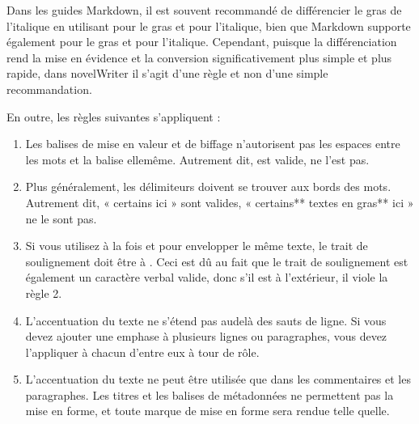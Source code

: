 \documentclass[a4paper,11pt,french]{sphinxmanual}
\begin{document}
\sphinxAtStartPar
Dans les guides Markdown, il est souvent recommandé de différencier le gras de l’italique en utilisant \sphinxcode{\sphinxupquote{**}} pour le gras et \sphinxcode{\sphinxupquote{\_}} pour l’italique, bien que Markdown supporte également \sphinxcode{\sphinxupquote{\_\_}} pour le gras et \sphinxcode{\sphinxupquote{*}} pour l’italique. Cependant, puisque la différenciation rend la mise en évidence et la conversion significativement plus simple et plus rapide, dans novelWriter il s’agit d’une règle et non d’une simple recommandation.

\sphinxAtStartPar
En outre, les règles suivantes s’appliquent :
\begin{enumerate}
%
\item {} 
\sphinxAtStartPar
Les balises de mise en valeur et de biffage n’autorisent pas les espaces entre les mots et la balise elle\sphinxhyphen{}même. Autrement dit,  est valide,  ne l’est pas.

\item {} 
\sphinxAtStartPar
Plus généralement, les délimiteurs doivent se trouver aux bords des mots. Autrement dit, « certains  ici » sont valides, « certains** textes en gras** ici » ne le sont pas.

\item {} 
\sphinxAtStartPar
Si vous utilisez à la fois \sphinxcode{\sphinxupquote{**}} et \sphinxcode{\sphinxupquote{\_}} pour envelopper le même texte, le trait de soulignement doit être à . Ceci est dû au fait que le trait de soulignement est également un caractère verbal valide, donc s’il est à l’extérieur, il viole la règle 2.

\item {} 
\sphinxAtStartPar
L’accentuation du texte ne s’étend pas au\sphinxhyphen{}delà des sauts de ligne. Si vous devez ajouter une emphase à plusieurs lignes ou paragraphes, vous devez l’appliquer à chacun d’entre eux à tour de rôle.

\item {} 
\sphinxAtStartPar
L’accentuation du texte ne peut être utilisée que dans les commentaires et les paragraphes. Les titres et les balises de métadonnées ne permettent pas la mise en forme, et toute marque de mise en forme sera rendue telle quelle.

\end{enumerate}
\end{document}
